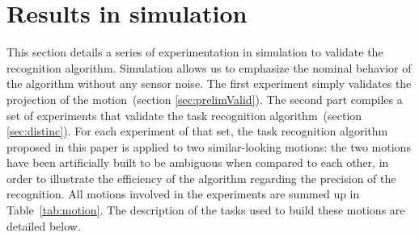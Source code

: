 \documentclass[letterpaper, 10pt, conference]{ieeeconf}      %
\begin{document}
\section{Results in simulation}
\label{sec:simu}
This section details a series of experimentation in simulation to validate the recognition algorithm.
Simulation allows us to emphasize the nominal behavior of the algorithm without 
any sensor noise.
The first experiment simply validates the projection of the motion~(section \ref{sec:prelimValid}). 
The second part compiles a set of experiments that validate the task recognition algorithm~(section \ref{sec:distinc}).
For each experiment of that set, the task recognition algorithm proposed in this paper
is applied to two similar-looking motions:
the two motions have been artificially built to be ambiguous when 
compared to each other, in order to illustrate the 
efficiency of the algorithm regarding the precision of the recognition.
All motions involved in the experiments are summed up in Table~\ref{tab:motion}.
The description of the tasks used to build these motions are detailed below.
\end{document}
